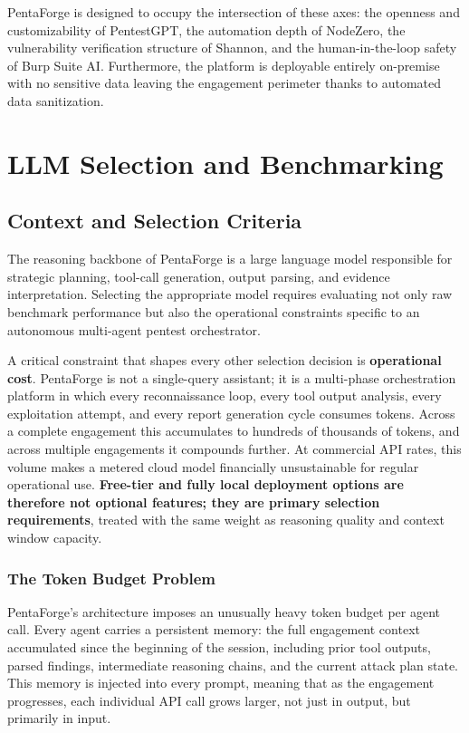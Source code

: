 \documentclass[12pt,a4paper]{report}
\begin{document}
PentaForge is designed to occupy the intersection of these axes: the openness
and customizability of PentestGPT, the automation depth of NodeZero, the
vulnerability verification structure of Shannon, and the human-in-the-loop safety
of Burp Suite AI. Furthermore, the platform is deployable entirely on-premise with no sensitive data leaving
the engagement perimeter thanks to automated data sanitization.

\section{LLM Selection and Benchmarking}

\subsection{Context and Selection Criteria}

The reasoning backbone of PentaForge is a large language model responsible for
strategic planning, tool-call generation, output parsing, and evidence
interpretation. Selecting the appropriate model requires evaluating not only raw
benchmark performance but also the operational constraints specific to an
autonomous multi-agent pentest orchestrator.

A critical constraint that shapes every other selection decision is
\textbf{operational cost}. PentaForge is not a single-query assistant; it is
a multi-phase orchestration platform in which every reconnaissance loop, every
tool output analysis, every exploitation attempt, and every report generation
cycle consumes tokens. Across a complete engagement this accumulates to hundreds
of thousands of tokens, and across multiple engagements it compounds further.
At commercial API rates, this volume makes a metered cloud model financially
unsustainable for regular operational use. \textbf{Free-tier and fully local
deployment options are therefore not optional features; they are primary
selection requirements}, treated with the same weight as reasoning quality
and context window capacity.

\subsubsection{The Token Budget Problem}

PentaForge's architecture imposes an unusually heavy token budget per agent call.
Every agent carries a persistent memory: the full engagement context accumulated
since the beginning of the session, including prior tool outputs, parsed findings,
intermediate reasoning chains, and the current attack plan state. This memory is
injected into every prompt, meaning that as the engagement progresses, each
individual API call grows larger, not just in output, but primarily in input.
\end{document}
